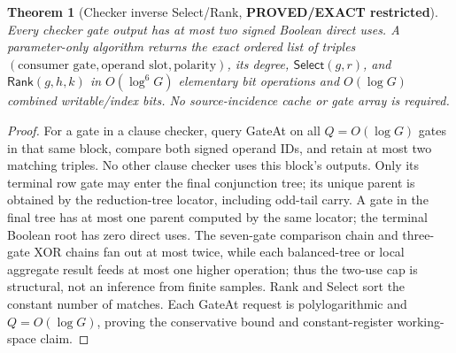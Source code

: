 \documentclass[11pt]{article}
\newtheorem{theorem}{Theorem}
\newcommand{\Select}{\mathsf{Select}}
\newcommand{\Rank}{\mathsf{Rank}}
\begin{document}
\begin{theorem}[Checker inverse Select/Rank, \textbf{PROVED/EXACT restricted}]
Every checker gate output has at most two signed Boolean direct uses.
A parameter-only algorithm returns the exact ordered list of triples
$(\text{consumer gate},\text{operand slot},\text{polarity})$, its degree,
$\Select(g,r)$, and $\Rank(g,h,k)$ in
$O(\log^6G)$ elementary bit operations and $O(\log G)$
combined writable/index bits. No source-incidence cache or gate array
is required.
\end{theorem}
\begin{proof}
For a gate in a clause checker, query GateAt on all $Q=O(\log G)$
gates in that same block, compare both signed operand IDs, and retain
at most two matching triples. No other clause checker uses this
block's outputs. Only its terminal row gate may enter the final
conjunction tree; its unique parent is obtained by the reduction-tree
locator, including odd-tail carry. A gate in the final tree has at
most one parent computed by the same locator; the terminal Boolean
root has zero direct uses. The seven-gate comparison chain and
three-gate XOR chains fan out at most twice, while each balanced-tree
or local aggregate result feeds at most one higher operation;
thus the two-use cap is structural, not an inference from finite
samples. Rank and Select sort the constant number of matches.
Each GateAt request is polylogarithmic and $Q=O(\log G)$, proving
the conservative bound and constant-register working-space claim.
\end{proof}
\end{document}
